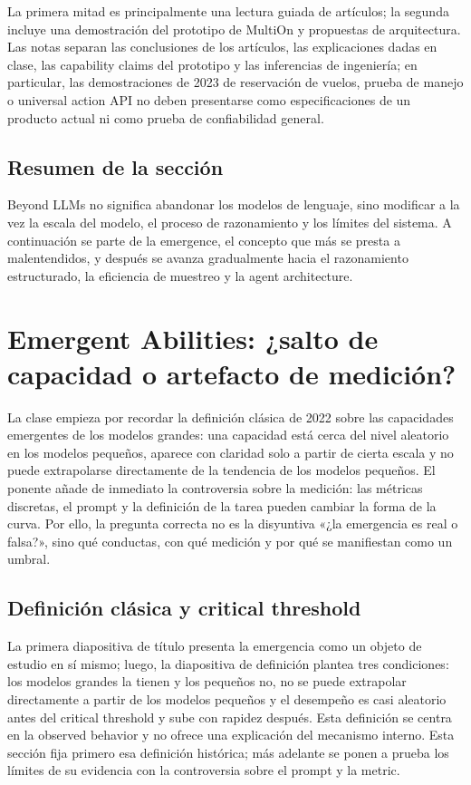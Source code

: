 \documentclass[a4paper]{article}
\begin{document}
La primera mitad es principalmente una lectura guiada de artículos; la segunda incluye una demostración del prototipo de MultiOn y propuestas de arquitectura. Las notas separan las conclusiones de los artículos, las explicaciones dadas en clase, las capability claims del prototipo y las inferencias de ingeniería; en particular, las demostraciones de 2023 de reservación de vuelos, prueba de manejo o universal action API no deben presentarse como especificaciones de un producto actual ni como prueba de confiabilidad general.

\subsection{Resumen de la sección}

Beyond LLMs no significa abandonar los modelos de lenguaje, sino modificar a la vez la escala del modelo, el proceso de razonamiento y los límites del sistema. A continuación se parte de la emergence, el concepto que más se presta a malentendidos, y después se avanza gradualmente hacia el razonamiento estructurado, la eficiencia de muestreo y la agent architecture.
\section{Emergent Abilities: ¿salto de capacidad o artefacto de medición?}

La clase empieza por recordar la definición clásica de 2022 sobre las capacidades emergentes de los modelos grandes: una capacidad está cerca del nivel aleatorio en los modelos pequeños, aparece con claridad solo a partir de cierta escala y no puede extrapolarse directamente de la tendencia de los modelos pequeños. El ponente añade de inmediato la controversia sobre la medición: las métricas discretas, el prompt y la definición de la tarea pueden cambiar la forma de la curva. Por ello, la pregunta correcta no es la disyuntiva «¿la emergencia es real o falsa?», sino qué conductas, con qué medición y por qué se manifiestan como un umbral.

\subsection{Definición clásica y critical threshold}

La primera diapositiva de título presenta la emergencia como un objeto de estudio en sí mismo; luego, la diapositiva de definición plantea tres condiciones: los modelos grandes la tienen y los pequeños no, no se puede extrapolar directamente a partir de los modelos pequeños y el desempeño es casi aleatorio antes del critical threshold y sube con rapidez después. Esta definición se centra en la observed behavior y no ofrece una explicación del mecanismo interno. Esta sección fija primero esa definición histórica; más adelante se ponen a prueba los límites de su evidencia con la controversia sobre el prompt y la metric.
\end{document}
